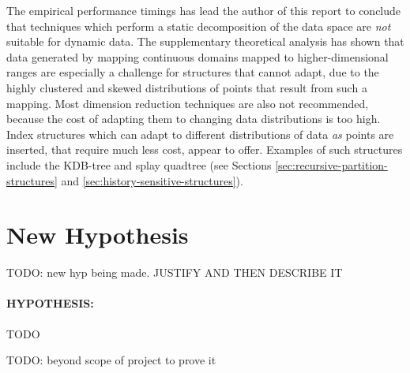 The empirical performance timings has lead the author of this report to conclude that techniques which perform a static decomposition of the data space are \textit{not} suitable for dynamic data. The supplementary theoretical analysis has shown that data generated by mapping continuous domains mapped to higher-dimensional ranges are especially a challenge for structures that cannot adapt, due to the highly clustered and skewed distributions of points that result from such a mapping. Most dimension reduction techniques are also not recommended, because the cost of adapting them to changing data distributions is too high. Index structures which can adapt to different distributions of data \textit{as} points are inserted, that require much less cost, appear to offer. Examples of such structures include the KDB-tree and splay quadtree (see Sections \ref{sec:recursive-partition-structures} and \ref{sec:history-sensitive-structures}).

\section{New Hypothesis}

TODO: new hyp being made. JUSTIFY AND THEN DESCRIBE IT

\paragraph{\textbf{HYPOTHESIS:}} TODO

TODO: beyond scope of project to prove it